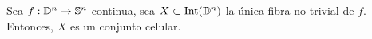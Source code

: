 

\begin{lema}\label{celulares}
    Sea $f:\mathbb{D}^n\to \mathbb{S}^n$ continua, sea $X\subset \text{Int}(\mathbb{D}^n)$ la única fibra no trivial de $f$. Entonces, $X$ es un conjunto celular.
\end{lema}

